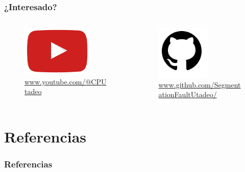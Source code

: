 \documentclass[17pt, t, lualatex]{beamer}
\begin{document}
\begin{frame}
  \frametitle{¿Interesado?}
  \begin{columns}
    \begin{column}{.5\textwidth}
      \begin{figure}
        \centering
        \includegraphics[width=0.8\textwidth]{img/YT.jpg}
        \caption{\url{www.youtube.com/@CPUtadeo}}
      \end{figure}
    \end{column}


    \begin{column}{.5\textwidth}
      \begin{figure}
        \centering
        \includegraphics[width=0.6\textwidth]{img/GH.png}
        \caption{\url{www.github.com/SegmentationFaultUtadeo/}}
      \end{figure}
    \end{column}

  \end{columns}
\end{frame}








\section{Referencias}
\begin{frame}
  \frametitle{Referencias}
  \printbibliography

\end{frame}

\insertendpage
\end{document}

